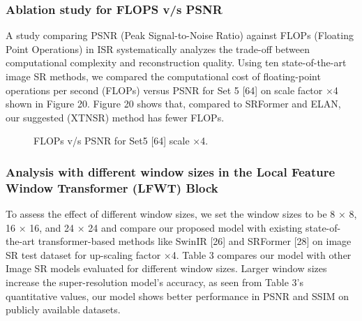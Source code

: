\documentclass[twocolumn]{svjour3}          %
\begin{document}
\subsubsection{Ablation study for FLOPS v/s PSNR}

A study comparing PSNR (Peak Signal-to-Noise Ratio) against FLOPs (Floating Point Operations) in ISR systematically analyzes the trade-off between computational complexity and reconstruction quality. Using ten state-of-the-art image SR methods, we compared the computational cost of floating-point operations per second (FLOPs) versus PSNR for Set 5 [64] on scale factor ×4 shown in Figure 20. Figure 20 shows that, compared to SRFormer and ELAN, our suggested (XTNSR) method has fewer FLOPs. 

\begin{figure}
  \centering
   \caption {FLOPs v/s PSNR for Set5 [64] scale ×4.}
    \label{fig:20}
\end{figure}

\subsubsection{Analysis with different window sizes in the Local Feature Window Transformer (LFWT) Block}

To assess the effect of different window sizes, we set the window sizes to be 8 × 8, 16 × 16, and 24 × 24 and compare our proposed model with existing state-of-the-art transformer-based methods like SwinIR [26] and SRFormer [28] on image SR test dataset for up-scaling factor ×4. Table 3 compares our model with other Image SR models evaluated for different window sizes. Larger window sizes increase the super-resolution model's accuracy, as seen from Table 3's quantitative values, our model shows better performance in PSNR and SSIM on publicly available datasets.
\end{document}
